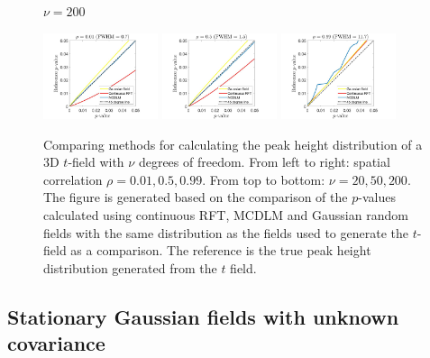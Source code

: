 \documentclass{article}
\begin{document}
\begin{figure}[!htp]
\begin{sideways}
\phantom{------------------}$\nu = 200$
\end{sideways}
\includegraphics[trim=70 5 100 5, clip,width=0.3\textwidth]{figure/3D_nu200_rho0.01.jpg}
\includegraphics[trim=70 5 100 5, clip,width=0.3\textwidth]{figure/3D_nu200_rho0.5.jpg}
\includegraphics[trim=70 5 100 5, clip,width=0.3\textwidth]{figure/3D_nu200_rho0.99.jpg}
\caption{Comparing methods for calculating the peak height distribution of a 3D $t$-field with $\nu$ degrees of freedom. From left to right: spatial correlation $\rho = 0.01, 0.5, 0.99$. From top to bottom: $\nu = 20, 50, 200$. The figure is generated based on the comparison of the $p$-values calculated using continuous RFT, MCDLM and Gaussian random fields with the same distribution as the fields used to generate the $t$-field as a comparison. The reference is the true peak height distribution generated from the $t$ field. \label{fig12}}
\end{figure}

\clearpage
\subsection{Stationary Gaussian fields with unknown covariance}
\label{sec4.4}
\end{document}
